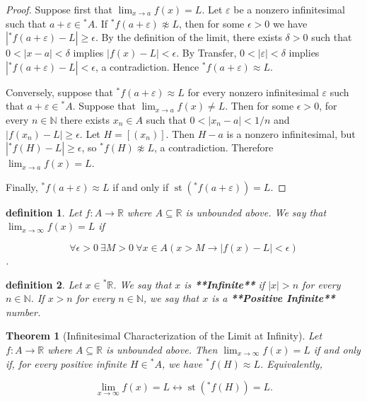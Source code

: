 \documentclass[10pt,a4paper]{book}
\newtheorem{definition}{definition}[section]
\newtheorem{theorem}{Theorem}[section]
\begin{document}
\begin{proof}

    Suppose first that $\lim_{x\to a}f(x)=L$. Let $\varepsilon$ be a nonzero
    infinitesimal such that $a+\varepsilon\in{}^*A$. If
    ${}^*f(a+\varepsilon)\not\approx L$, then for some $\epsilon>0$ we have
    $|{}^*f(a+\varepsilon)-L|\geq\epsilon$. By the definition of the limit, there
    exists $\delta>0$ such that $0<|x-a|<\delta$ implies $|f(x)-L|<\epsilon$. By
    Transfer, $0<|\varepsilon|<\delta$ implies $|{}^*f(a+\varepsilon)-L|<\epsilon$,
    a contradiction. Hence ${}^*f(a+\varepsilon)\approx L$.

    Conversely, suppose that ${}^*f(a+\varepsilon)\approx L$ for every nonzero
    infinitesimal $\varepsilon$ such that $a+\varepsilon\in{}^*A$. Suppose that
    $\lim_{x\to a}f(x)\neq L$. Then for some $\epsilon>0$, for every $n\in\mathbb
        N$ there exists $x_n\in A$ such that $0<|x_n-a|<1/n$ and
    $|f(x_n)-L|\geq\epsilon$. Let $H=[(x_n)]$. Then $H-a$ is a nonzero
    infinitesimal, but $|{}^*f(H)-L|\geq\epsilon$, so ${}^*f(H)\not\approx L$, a
    contradiction. Therefore $\lim_{x\to a}f(x)=L$.

    Finally, ${}^*f(a+\varepsilon)\approx L$ if and only if
    $\operatorname{st}({}^*f(a+\varepsilon))=L$.

\end{proof}

\begin{definition}

    Let $f:A\to\mathbb R$ where $A\subseteq\mathbb R$ is unbounded above. We say
    that $\lim_{x\to\infty}f(x)=L$ if

    $$\forall\epsilon>0\ \exists M>0\ \forall x\in
        A\left(x>M \to|f(x)-L|<\epsilon\right)$$.

\end{definition}

\begin{definition}

    Let $x\in{}^*\mathbb R$. We say that $x$ is \textbf{**Infinite**} if $|x|>n$
    for every $n\in\mathbb N$. If $x>n$ for every $n\in\mathbb N$, we say that $x$
    is a \textbf{**Positive Infinite**} number.

\end{definition}

\begin{theorem}[Infinitesimal Characterization of the Limit at Infinity]

    Let $f:A\to\mathbb R$ where $A\subseteq\mathbb R$ is unbounded above. Then
    $\lim_{x\to\infty}f(x)=L$ if and only if, for every positive infinite
    $H\in{}^*A$, we have ${}^*f(H)\approx L$. Equivalently,

    $$
        \lim_{x\to\infty}f(x)=L\leftrightarrow\operatorname{st}({}^*f(H))=L.
    $$

\end{theorem}
\end{document}
